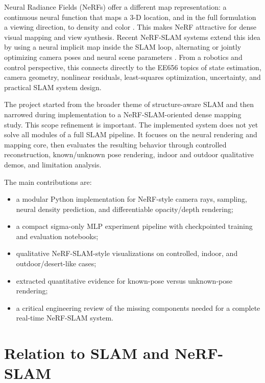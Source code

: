 \documentclass[conference]{IEEEtran}
\begin{document}
Neural Radiance Fields (NeRFs) offer a different map representation: a continuous neural function that maps a 3-D location, and in the full formulation a viewing direction, to density and color \cite{mildenhall2020nerf}. This makes NeRF attractive for dense visual mapping and view synthesis. Recent NeRF-SLAM systems extend this idea by using a neural implicit map inside the SLAM loop, alternating or jointly optimizing camera poses and neural scene parameters \cite{sucar2021imap,zhu2022nice}. From a robotics and control perspective, this connects directly to the EE656 topics of state estimation, camera geometry, nonlinear residuals, least-squares optimization, uncertainty, and practical SLAM system design.

The project started from the broader theme of structure-aware SLAM and then narrowed during implementation to a NeRF-SLAM-oriented dense mapping study. This scope refinement is important. The implemented system does not yet solve all modules of a full SLAM pipeline. It focuses on the neural rendering and mapping core, then evaluates the resulting behavior through controlled reconstruction, known/unknown pose rendering, indoor and outdoor qualitative demos, and limitation analysis.

The main contributions are:
\begin{itemize}
    \item a modular Python implementation for NeRF-style camera rays, sampling, neural density prediction, and differentiable opacity/depth rendering;
    \item a compact sigma-only MLP experiment pipeline with checkpointed training and evaluation notebooks;
    \item qualitative NeRF-SLAM-style visualizations on controlled, indoor, and outdoor/desert-like cases;
    \item extracted quantitative evidence for known-pose versus unknown-pose rendering;
    \item a critical engineering review of the missing components needed for a complete real-time NeRF-SLAM system.
\end{itemize}

\section{Relation to SLAM and NeRF-SLAM}
\end{document}
